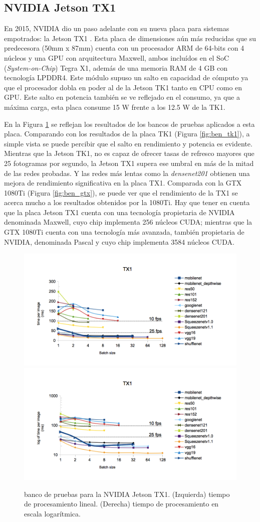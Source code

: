\subsection{NVIDIA Jetson TX1}

En 2015, NVIDIA dio un paso adelante con su nueva placa para sistemas empotrados: la Jetson TX1 \cite{jetsontx1}. Esta placa de dimensiones aún más reducidas que su predecesora (50mm x 87mm) cuenta con un procesador ARM de 64-bits con 4 núcleos y una GPU con arquitectura Maxwell, ambos incluídos en el SoC (\textit{System-on-Chip}) Tegra X1, además de una memoria RAM de 4 GB con tecnología LPDDR4. Este módulo supuso un salto en capacidad de cómputo ya que el procesador dobla en poder al de la Jetson TK1 tanto en CPU como en GPU. Este salto en potencia también se ve reflejado en el consumo, ya que a máxima carga, esta placa consume 15 W frente a los 12.5 W de la TK1.

En la Figura \ref{fig:ben_tx1} se reflejan los resultados de los bancos de pruebas aplicados a esta placa. Comparando con los resultados de la placa TK1 (Figura \ref{fig:ben_tk1}), a simple vista se puede percibir que el salto en rendimiento y potencia es evidente. Mientras que la Jetson TK1, no es capaz de ofrecer tasas de refresco mayores que 25 fotogramas por segundo, la Jetson TX1 supera ese umbral en más de la mitad de las redes probadas. Y las redes más lentas como la \textit{densenet201} obtienen una mejora de rendimiento significativa en la placa TX1.
Comparada con la GTX 1080Ti (Figura \ref{fig:ben_gtx}), se puede ver que el rendimiento de la TX1 se acerca mucho a los resultados obtenidos por la 1080Ti. Hay que tener en cuenta que la placa Jetson TX1 cuenta con una tecnología propietaria de NVIDIA denominada Maxwell, cuyo chip implementa 256 núcleos CUDA; mientras que la GTX 1080Ti cuenta con una tecnología más avanzada, también propietaria de NVIDIA, denominada Pascal y cuyo chip implementa 3584 núcleos CUDA.

\begin{figure}[htp]
    \centering
    \captionsetup{justification=centering}
    \includegraphics[width=.5\textwidth]{img/TX1_linear.png}\hfill
    \includegraphics[width=.5\textwidth]{img/TX1_log.png}
    \caption{banco de pruebas para la NVIDIA Jetson TX1. (Izquierda) tiempo de procesamiento lineal. (Derecha) tiempo de procesamiento en escala logarítmica.}
    \label{fig:ben_tx1}
\end{figure}

